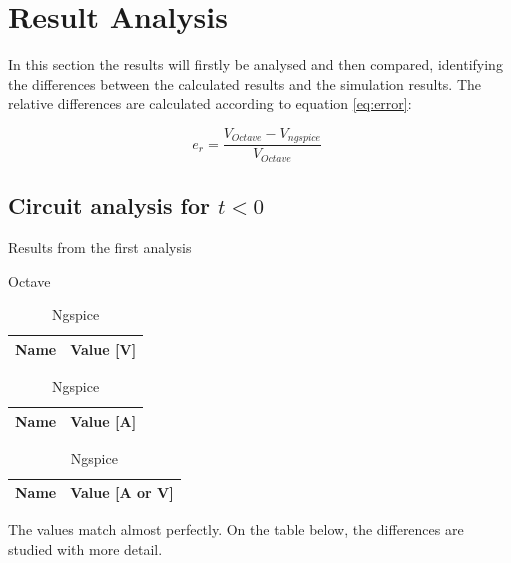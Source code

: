\section{Result Analysis}
\label{sec:ResultAnalysis}

\indent

In this section the results will firstly be analysed and then compared, identifying the differences between the calculated results and the simulation results. The relative differences are calculated according to equation \ref{eq:error}:

\begin{equation}
    e_r = \frac{V_{Octave}-V_{ngspice}}{V_{Octave}} \hspace{5pt}
    \label{eq:error}
\end{equation}

\subsection{Circuit analysis for $t<0$}


\begin{table}[H]
    \caption{Results from the first analysis}
    \begin{subtable}{.5\linewidth}
      \centering
        \caption{Octave}
        \begin{tabular}{ll}
        \hline    
        {\bf Name} & {\bf Value [V]} \\ \hline
        
        \end{tabular}
        \begin{tabular}{ll}
        \hline    
        {\bf Name} & {\bf Value [A]} \\ \hline
        
        \end{tabular}
        \label{tab:OpVOc}
    \end{subtable}%
    \begin{subtable}{.5\linewidth}
      \centering
        \caption{Ngspice}
        \begin{tabular}{ll}
        \hline    
        {\bf Name} & {\bf Value [A or V]} \\ \hline
        
        \end{tabular}
        \label{tab:OpNgs}
    \end{subtable} 
    \label{tab:Op}
\end{table}

The values match almost perfectly. On the table below, the differences are studied with more detail.

